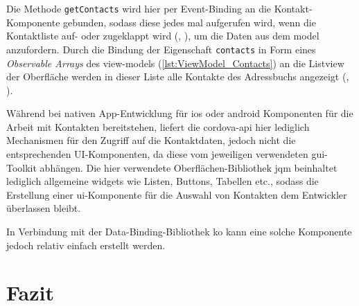 
Die Methode \lstinline|getContacts| wird hier per Event-Binding an die Kontakt-Komponente gebunden, sodass diese jedes mal aufgerufen wird, wenn die Kontaktliste auf- oder zugeklappt wird (, ), um die Daten aus dem \gls{model} anzufordern.
Durch die Bindung der Eigenschaft \lstinline|contacts| in Form eines \emph{Observable Arrays} des \glspl{view-model} (\autoref{lst:ViewModel_Contacts}) an die Listview der Oberfläche werden in dieser Liste alle Kontakte des Adressbuchs angezeigt (, ).

		
Während bei nativen App-Entwicklung für \gls{ios} oder \gls{android} Komponenten für die Arbeit mit Kontakten bereitstehen, liefert die \gls{cordova}-\gls{api} hier lediglich Mechanismen für den Zugriff auf die Kontaktdaten, jedoch nicht die entsprechenden UI-Komponenten, da diese vom jeweiligen verwendeten \gls{gui}-Toolkit abhängen.
Die hier verwendete Oberflächen-Bibliothek \gls{jqm} beinhaltet lediglich allgemeine \glspl{widget} wie Listen, Buttons, Tabellen etc., sodass die Erstellung einer \gls{ui}-Komponente für die Auswahl von Kontakten dem Entwickler überlassen bleibt.

In Verbindung mit der Data-Binding-Bibliothek \gls{ko} kann eine solche Komponente jedoch relativ einfach erstellt werden.




	\section{Fazit} %
